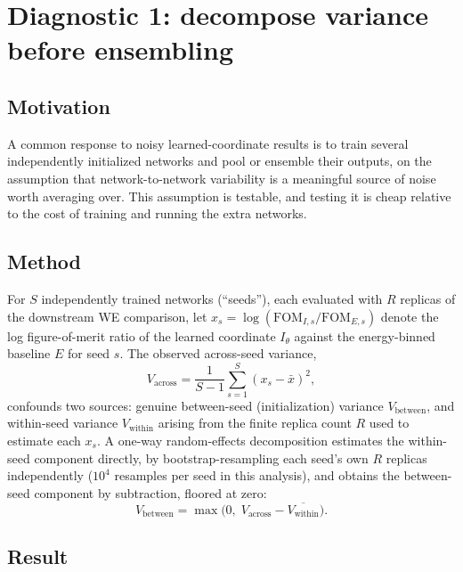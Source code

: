 \documentclass[a4paper,fleqn]{cas-sc}
\newcommand{\FOM}{\mathrm{FOM}}
\begin{document}
\section{Diagnostic 1: decompose variance before ensembling}\label{sec:diag1}

\subsection{Motivation}

A common response to noisy learned-coordinate results is to train several
independently initialized networks and pool or ensemble their outputs, on
the assumption that network-to-network variability is a meaningful source of
noise worth averaging over. This assumption is testable, and testing it is
cheap relative to the cost of training and running the extra networks.

\subsection{Method}

For $S$ independently trained networks (``seeds''), each evaluated with $R$
replicas of the downstream WE comparison, let $x_s = \log(\FOM_{I,s} /
\FOM_{E,s})$ denote the log figure-of-merit ratio of the learned coordinate
$I_\theta$ against the energy-binned baseline $E$ for seed $s$. The observed
across-seed variance,
\begin{equation}
V_{\text{across}} = \frac{1}{S-1}\sum_{s=1}^{S} (x_s - \bar x)^2,
\end{equation}
confounds two sources: genuine between-seed (initialization) variance
$V_{\text{between}}$, and within-seed variance $V_{\text{within}}$ arising
from the finite replica count $R$ used to estimate each $x_s$. A one-way
random-effects decomposition estimates the within-seed component directly,
by bootstrap-resampling each seed's own $R$ replicas independently ($10^4$
resamples per seed in this analysis), and obtains the between-seed component
by subtraction, floored at zero:
\begin{equation}
V_{\text{between}} = \max\!\big(0,\; V_{\text{across}} - \overline{V_{\text{within}}}\big).
\end{equation}

\subsection{Result}
\end{document}
